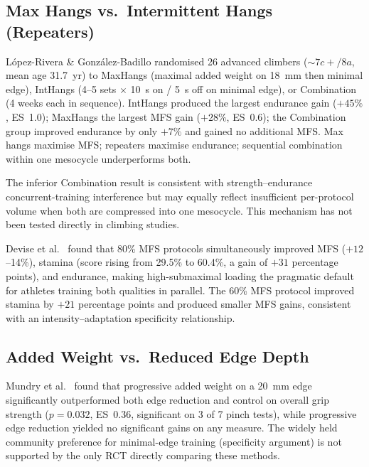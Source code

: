 \documentclass[12pt,a4paper]{article}
\begin{document}
\subsection{Max Hangs vs.\ Intermittent Hangs (Repeaters)}
\label{sec:maxvsrep}

\begin{evidencebox}
López-Rivera \& González-Badillo \cite{lopezrivera2019} randomised 26 advanced climbers (${\sim}7c{+}/8a$, mean age 31.7~yr) to MaxHangs (maximal added weight on 18~mm then minimal edge), IntHangs (4--5 sets $\times$ 10~s on / 5~s off on minimal edge), or Combination (4 weeks each in sequence). IntHangs produced the largest endurance gain ($+45\%$, ES~1.0); MaxHangs the largest MFS gain ($+28\%$, ES~0.6); the Combination group improved endurance by only $+7\%$ and gained no additional MFS. Max hangs maximise MFS; repeaters maximise endurance; sequential combination within one mesocycle underperforms both.
\end{evidencebox}

\begin{bioplausbox}
The inferior Combination result is consistent with strength--endurance concurrent-training interference but may equally reflect insufficient per-protocol volume when both are compressed into one mesocycle. This mechanism has not been tested directly in climbing studies.
\end{bioplausbox}

Devise et al.\ \cite{devise2022} found that 80\% MFS protocols simultaneously improved MFS ($+12$--14\%), stamina (score rising from 29.5\% to 60.4\%, a gain of $+31$ percentage points), and endurance, making high-submaximal loading the pragmatic default for athletes training both qualities in parallel. The 60\% MFS protocol improved stamina by $+21$ percentage points and produced smaller MFS gains, consistent with an intensity--adaptation specificity relationship.

\subsection{Added Weight vs.\ Reduced Edge Depth}

\begin{evidencebox}
Mundry et al.\ \cite{mundry2021} found that progressive added weight on a 20~mm edge significantly outperformed both edge reduction and control on overall grip strength ($p=0.032$, ES~$0.36$, significant on 3 of 7 pinch tests), while progressive edge reduction yielded no significant gains on any measure. The widely held community preference for minimal-edge training (specificity argument) is not supported by the only RCT directly comparing these methods.
\end{evidencebox}
\end{document}

